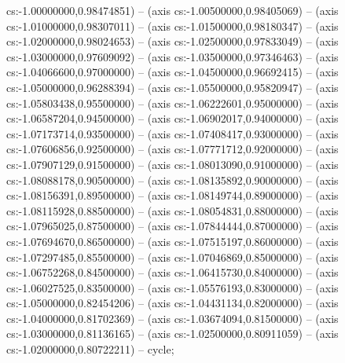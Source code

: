 cs:-1.00000000,0.98474851) -- (axis cs:-1.00500000,0.98405069) -- (axis cs:-1.01000000,0.98307011) -- (axis cs:-1.01500000,0.98180347) -- (axis cs:-1.02000000,0.98024653) -- (axis cs:-1.02500000,0.97833049) -- (axis cs:-1.03000000,0.97609092) -- (axis cs:-1.03500000,0.97346463) -- (axis cs:-1.04066600,0.97000000) -- (axis cs:-1.04500000,0.96692415) -- (axis cs:-1.05000000,0.96288394) -- (axis cs:-1.05500000,0.95820947) -- (axis cs:-1.05803438,0.95500000) -- (axis cs:-1.06222601,0.95000000) -- (axis cs:-1.06587204,0.94500000) -- (axis cs:-1.06902017,0.94000000) -- (axis cs:-1.07173714,0.93500000) -- (axis cs:-1.07408417,0.93000000) -- (axis cs:-1.07606856,0.92500000) -- (axis cs:-1.07771712,0.92000000) -- (axis cs:-1.07907129,0.91500000) -- (axis cs:-1.08013090,0.91000000) -- (axis cs:-1.08088178,0.90500000) -- (axis cs:-1.08135892,0.90000000) -- (axis cs:-1.08156391,0.89500000) -- (axis cs:-1.08149744,0.89000000) -- (axis cs:-1.08115928,0.88500000) -- (axis cs:-1.08054831,0.88000000) -- (axis cs:-1.07965025,0.87500000) -- (axis cs:-1.07844444,0.87000000) -- (axis cs:-1.07694670,0.86500000) -- (axis cs:-1.07515197,0.86000000) -- (axis cs:-1.07297485,0.85500000) -- (axis cs:-1.07046869,0.85000000) -- (axis cs:-1.06752268,0.84500000) -- (axis cs:-1.06415730,0.84000000) -- (axis cs:-1.06027525,0.83500000) -- (axis cs:-1.05576193,0.83000000) -- (axis cs:-1.05000000,0.82454206) -- (axis cs:-1.04431134,0.82000000) -- (axis cs:-1.04000000,0.81702369) -- (axis cs:-1.03674094,0.81500000) -- (axis cs:-1.03000000,0.81136165) -- (axis cs:-1.02500000,0.80911059) -- (axis cs:-1.02000000,0.80722211) -- cycle;

